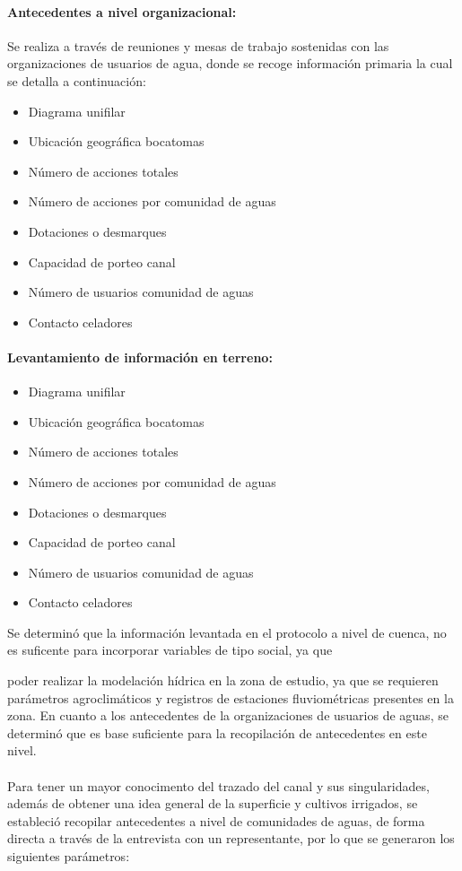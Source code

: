 \documentclass[]{article}
\begin{document}
\paragraph{Antecedentes a nivel organizacional:}

Se realiza a través de reuniones y mesas de trabajo sostenidas con las organizaciones de usuarios de agua, donde se recoge información primaria la cual se detalla a continuación:\\

\begin{itemize}
\item Diagrama unifilar
\item Ubicación geográfica bocatomas
\item Número de acciones totales
\item Número de acciones por comunidad de aguas
\item Dotaciones o desmarques
\item Capacidad de porteo canal
\item Número de usuarios comunidad de aguas
\item Contacto celadores
\end{itemize}

\paragraph{Levantamiento de información en terreno:}

\begin{itemize}
\item Diagrama unifilar
\item Ubicación geográfica bocatomas
\item Número de acciones totales
\item Número de acciones por comunidad de aguas
\item Dotaciones o desmarques
\item Capacidad de porteo canal
\item Número de usuarios comunidad de aguas
\item Contacto celadores
\end{itemize}
Se determinó que la información levantada en el protocolo a nivel de cuenca, no es suficente para incorporar variables de tipo social, ya que 

poder realizar la modelación hídrica en la zona de estudio, ya que se requieren parámetros agroclimáticos y registros de estaciones fluviométricas presentes en la zona. En cuanto a los antecedentes de la organizaciones de usuarios de aguas, se determinó que es base suficiente para la recopilación de antecedentes en este nivel.\\
\\
Para tener un mayor conocimento del trazado del canal y sus singularidades, además de obtener una idea general de la superficie y cultivos irrigados, se estableció recopilar antecedentes a nivel de comunidades de aguas, de forma directa a través de la entrevista con un representante, por lo que se generaron los siguientes parámetros:
\end{document}
